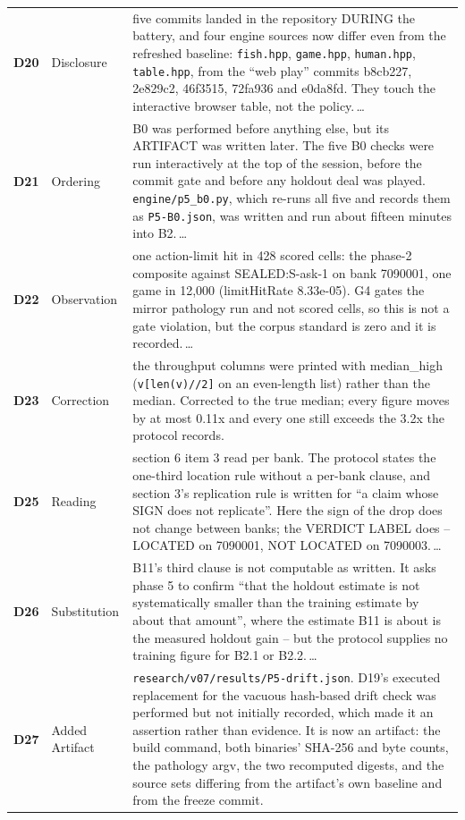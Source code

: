 \begin{xltabular}{\linewidth}{@{}l l L@{}}
\textbf{D20} & Disclosure & five commits landed in the repository DURING the battery, and four engine sources now differ even from the refreshed baseline: \texttt{fish.hpp}, \texttt{game.hpp}, \texttt{human.hpp}, \texttt{table.hpp}, from the ``web play'' commits b8cb227, 2e829c2, 46f3515, 72fa936 and e0da8fd. They touch the interactive browser table, not the policy.\,\ldots \\
\textbf{D21} & Ordering & B0 was performed before anything else, but its ARTIFACT was written later. The five B0 checks were run interactively at the top of the session, before the commit gate and before any holdout deal was played. \texttt{engine/p5\_b0.py}, which re-runs all five and records them as \texttt{P5-B0.json}, was written and run about fifteen minutes into B2.\,\ldots \\
\textbf{D22} & Observation & one action-limit hit in 428 scored cells: the phase-2 composite against SEALED:S-ask-1 on bank 7090001, one game in 12,000 (limitHitRate 8.33e-05). G4 gates the mirror pathology run and not scored cells, so this is not a gate violation, but the corpus standard is zero and it is recorded.\,\ldots \\
\textbf{D23} & Correction & the throughput columns were printed with median\_high (\texttt{v[len(v)//2]} on an even-length list) rather than the median. Corrected to the true median; every figure moves by at most 0.11x and every one still exceeds the 3.2x the protocol records. \\
\textbf{D25} & Reading & section 6 item 3 read per bank. The protocol states the one-third location rule without a per-bank clause, and section 3's replication rule is written for ``a claim whose SIGN does not replicate''. Here the sign of the drop does not change between banks; the VERDICT LABEL does -- LOCATED on 7090001, NOT LOCATED on 7090003.\,\ldots \\
\textbf{D26} & Substitution & B11's third clause is not computable as written. It asks phase 5 to confirm ``that the holdout estimate is not systematically smaller than the training estimate by about that amount'', where the estimate B11 is about is the measured holdout gain -- but the protocol supplies no training figure for B2.1 or B2.2.\,\ldots \\
\textbf{D27} & Added Artifact & \texttt{research/v07/results/P5-drift.json}. D19's executed replacement for the vacuous hash-based drift check was performed but not initially recorded, which made it an assertion rather than evidence. It is now an artifact: the build command, both binaries' SHA-256 and byte counts, the pathology argv, the two recomputed digests, and the source sets differing from the artifact's own baseline and from the freeze commit. \\

\end{xltabular}
